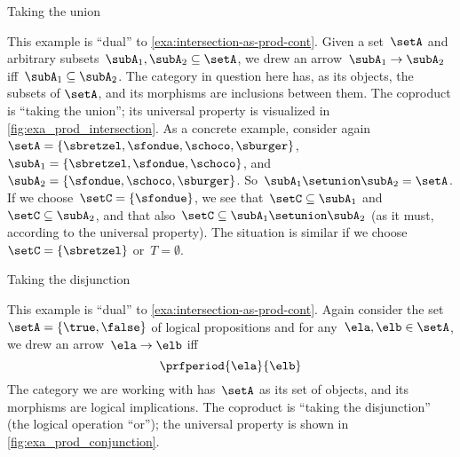 \begin{marginfigure}
    \centering
    \caption{Taking the union}
    \label{fig:exa_coprod_union_cont}
\end{marginfigure}

\begin{example}
    \label{exa:union-as-coprod-cont}
    This example is ``dual'' to \cref{exa:intersection-as-prod-cont}.
    Given a set~$\setA$ and arbitrary subsets~$\subA_1, \subA_2 \subseteq \setA$, we drew an arrow~$\subA_1 \to \subA_2$ iff~$\subA_1 \subseteq \subA_2$.
    The category in question here has, as its objects, the subsets of $\setA$, and its morphisms are inclusions between them.
    The coproduct is ``taking the union''; its universal property is visualized in \cref{fig:exa_prod_intersection}.
    As a concrete example, consider again~$\setA = \{ \sbretzel, \sfondue, \schoco, \sburger \}$,~$\subA_1 = \{ \sbretzel, \sfondue, \schoco \}$, and~$\subA_2 = \{\sfondue, \schoco, \sburger \}$.
    So~$\subA_1 \setunion \subA_2 = \setA$.
    If we choose~$\setC = \{ \sfondue \}$, we see that~$\setC \subseteq \subA_1$ and~$\setC \subseteq \subA_2$, and that also~$\setC \subseteq \subA_1 \setunion \subA_2$ (as it must, according to the universal property).
    The situation is similar if we choose~$\setC = \{ \sbretzel \}$ or~$T = \emptyset$.
\end{example}

\begin{marginfigure}
    \centering
    \caption{Taking the disjunction}
    \label{fig:exa_coprod_disjunction_cont}
\end{marginfigure}

\begin{example}
    \label{exa:disjunction-as-coprod-cont}
    This example is ``dual'' to \cref{exa:intersection-as-prod-cont}.
    Again consider the set~$\setA = \{ \true, \false \}$ of logical propositions and for any~$\ela, \elb  \in \setA$, we drew an arrow~$\ela \to \elb$ iff
    \begin{equation*}
        \prfperiod{\ela}{\elb}
    \end{equation*}
    The category we are working with has~$\setA$ as its set of objects, and its morphisms are logical implications.
    The coproduct is ``taking the disjunction'' (the logical operation ``or''); the universal property is shown in \cref{fig:exa_prod_conjunction}.
\end{example}

